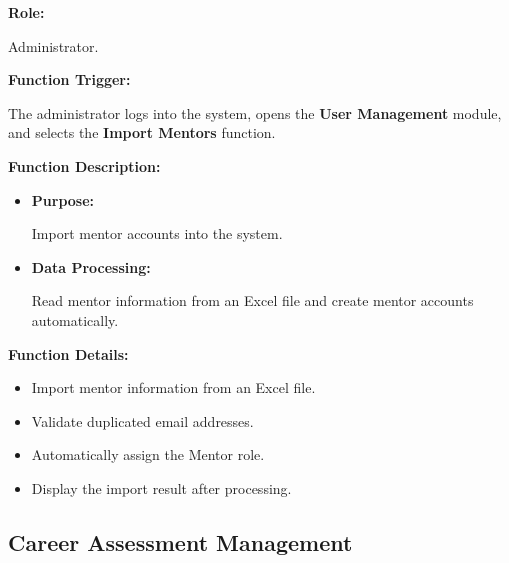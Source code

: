 \textbf{Role:}

Administrator.

\vspace{0.3cm}

\textbf{Function Trigger:}

The administrator logs into the system, opens the \textbf{User Management} module, and selects the \textbf{Import Mentors} function.

\vspace{0.3cm}

\textbf{Function Description:}

\begin{itemize}
    \item \textbf{Purpose:}

    Import mentor accounts into the system.

    \item \textbf{Data Processing:}

    Read mentor information from an Excel file and create mentor accounts automatically.
\end{itemize}

\vspace{0.3cm}

\textbf{Function Details:}

\begin{itemize}
    \item Import mentor information from an Excel file.

    \item Validate duplicated email addresses.

    \item Automatically assign the Mentor role.

    \item Display the import result after processing.
\end{itemize}


\subsection{Career Assessment Management}

